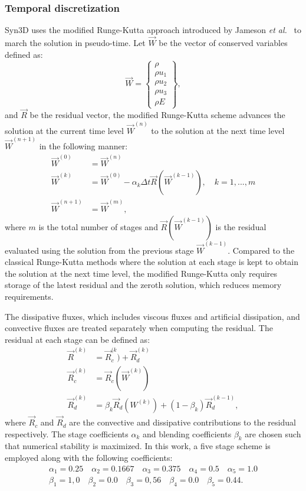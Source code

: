 \subsubsection{Temporal discretization}
%
Syn3D uses the modified Runge-Kutta approach introduced by Jameson \textit{et al.}~\cite{jameson1981numerical} to march the solution in pseudo-time. Let $\vec{W}$ be the vector of conserved variables defined as:
\begin{equation}
    \vec{W} =
    \begin{Bmatrix}
        \rho \\
        \rho u_1 \\
        \rho u_2 \\
        \rho u_3 \\
        \rho E
    \end{Bmatrix}
    \label{eq:wstate},
\end{equation}
and $\vec{R}$ be the residual vector, the modified Runge-Kutta scheme advances the solution at the current time level $\vec{W}^{(n)}$ to the solution at the next time level $\vec{W}^{(n+1)}$ in the following manner:
\begin{align*}
    \vec{W}^{(0)} &= \vec{W}^{(n)} \\
    \vec{W}^{(k)} &= \vec{W}^{(0)} - \alpha_k \Delta t \vec{R}(\vec{W}^{(k-1)}),
        \quad k=1,...,m \\
    \vec{W}^{(n+1)} &= \vec{W}^{(m)},
\end{align*}
where $m$ is the total number of stages and $\vec{R}(\vec{W}^{(k-1)})$ is the residual evaluated using the solution from the previous stage $\vec{W}^{(k-1)}$. Compared to the classical Runge-Kutta methods where the solution at each stage is kept to obtain the solution at the next time level, the modified Runge-Kutta only requires storage of the latest residual and the zeroth solution, which reduces memory requirements.

The dissipative fluxes, which includes viscous fluxes and artificial dissipation, and convective fluxes are treated separately when computing the residual. The residual at each stage can be defined as:
\begin{align*}
    \vec{R}^{(k)} &= \vec{R}_{c}^{(k}) + \vec{R}_{d}^{(k)} \\
    \vec{R}_c^{(k)} &= \vec{R}_c(\vec{W}^{(k)}) \\
    \vec{R}_d^{(k)} &= \beta_k \vec{R}_d(W^{(k)}) + (1 - \beta_k)\vec{R}_d^{(k-1)},
\end{align*}
where $\vec{R}_c$ and $\vec{R}_d$ are the convective and dissipative contributions to the residual respectively. The stage coefficients $\alpha_k$ and blending coefficients $\beta_k$ are chosen such that numerical stability is maximized. In this work, a five stage scheme is employed along with the following coefficients:
\begin{align*}
    \alpha_1 = 0.25 \quad \alpha_2 = 0.1667 \quad \alpha_3 = 0.375
        \quad \alpha_4=0.5 \quad \alpha_5 = 1.0 \\
    \beta_1 = 1,0 \quad \beta_2 = 0.0 \quad \beta_3 = 0,56
        \quad \beta_4 = 0.0 \quad \beta_5 = 0.44.
\end{align*}
%
